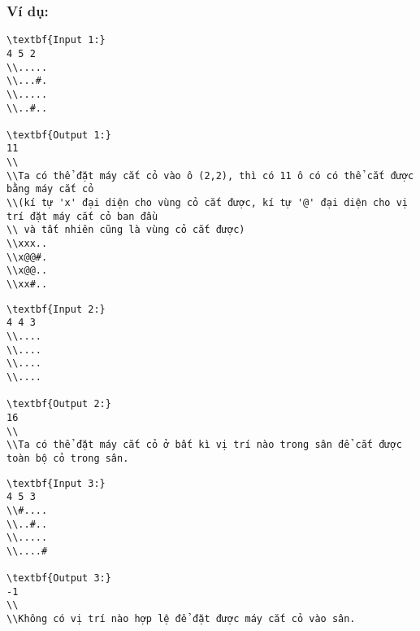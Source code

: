 \subsubsection{   Ví dụ:  }
\begin{verbatim}
\textbf{Input 1:}
4 5 2
\\.....
\\...#.
\\.....
\\..#..

\textbf{Output 1:}
11
\\
\\Ta có thể đặt máy cắt cỏ vào ô (2,2), thì có 11 ô có có thể cắt được bằng máy cắt cỏ
\\(kí tự 'x' đại diện cho vùng cỏ cắt được, kí tự '@' đại diện cho vị trí đặt máy cắt cỏ ban đầu
\\ và tất nhiên cũng là vùng cỏ cắt được)
\\xxx..
\\x@@#.
\\x@@..
\\xx#..\end{verbatim}
\begin{verbatim}
\textbf{Input 2:}
4 4 3
\\....
\\....
\\....
\\....

\textbf{Output 2:}
16
\\
\\Ta có thể đặt máy cắt cỏ ở bất kì vị trí nào trong sân để cắt được toàn bộ cỏ trong sân.\end{verbatim}
\begin{verbatim}
\textbf{Input 3:}
4 5 3
\\#....
\\..#..
\\.....
\\....#

\textbf{Output 3:}
-1
\\
\\Không có vị trí nào hợp lệ để đặt được máy cắt cỏ vào sân.\end{verbatim}
